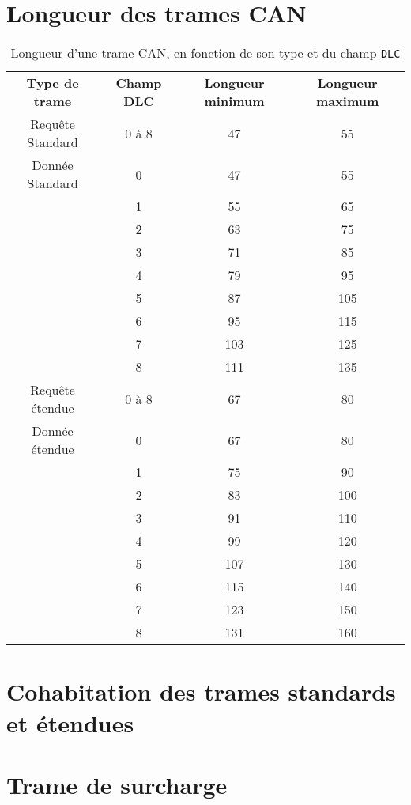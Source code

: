 \section{Longueur des trames CAN}

\begin{table}[!t]
  \small
  \centering
  \begin{tabular}{cccc}
    \textbf{Type de trame}& \textbf{Champ DLC} & \textbf{Longueur minimum} & \textbf{Longueur maximum} \\
    Requête Standard & 0 à 8 & 47 & 55 \\
    Donnée Standard & 0 & 47 & 55 \\
             & 1 & 55 & 65 \\
             & 2 & 63 & 75 \\
             & 3 & 71 & 85 \\
             & 4 & 79 & 95 \\
             & 5 & 87 & 105 \\
             & 6 & 95 & 115 \\
             & 7 & 103 & 125 \\
             & 8 & 111 & 135 \\
    Requête étendue  & 0 à 8 & 67 & 80 \\
    Donnée étendue  & 0 & 67 & 80 \\
             & 1 & 75 & 90 \\
             & 2 & 83 & 100 \\
             & 3 & 91 & 110 \\
             & 4 & 99 & 120 \\
             & 5 & 107 & 130 \\
             & 6 & 115 & 140 \\
             & 7 & 123 & 150 \\
             & 8 & 131 & 160 \\
   \end{tabular}
  \caption{Longueur d'une trame CAN, en fonction de son type et du champ \texttt{DLC}}
  \ligne
\end{table}












\section{Cohabitation des trames standards et étendues}








\section{Trame de surcharge}




